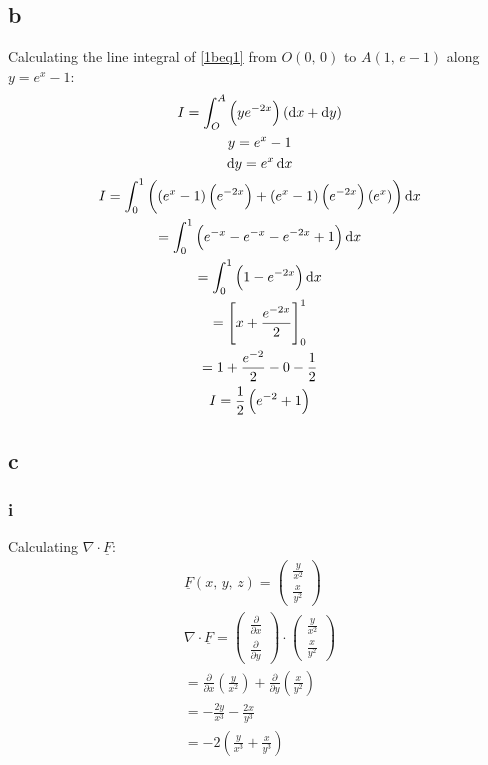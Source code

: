 \documentclass[11pt]{article}
\numberwithin{equation}{section}
\begin{document}
\subsection{b}
Calculating the line integral of \ref{1beq1} from $O\left(0, \, 0\right)$ to $A(1, \, e-1)$ along $y=e^x -1$:
\begin{gather}
    I = \int_O^A \left(ye^{-2x}\right)\left(\dif x + \dif y\right) \label{1beq1}\\
    y = e^x - 1\\
    \dif y = e^x \dif x\\
    I = \int_0^1 \left( \left( e^x-1\right) \left( e^{-2x} \right) + \left( e^x-1\right)\left( e^{-2x}\right)\left( e^x\right)\right)\dif x \\
    = \int_0^1 \left(e^{-x} - e^{-x} - e^{-2x} +1\right)\dif x\\
    = \int_0^1 \left(1-e^{-2x}\right)\dif x \\
    = \left[x + \frac{e^{-2x}}{2}\right]_0^1\\
    = 1 + \frac{e^{-2}}{2} -0-\frac{1}{2}\\
    I = \frac{1}{2}\left(e^{-2}+1\right)
\end{gather}
\subsection{c}
\subsubsection{i}
Calculating $\nabla \cdot \underline{F}$:
\begin{gather}
    \underline{F}\left(x, \, y, \, z\right) = \begin{pmatrix}
        \frac{y}{x^2}\\
        \frac{x}{y^2}
    \end{pmatrix}\\
    \nabla \cdot \underline{F} = \begin{pmatrix}
        \frac{\partial}{\partial x}\\
        \frac{\partial}{\partial y}
    \end{pmatrix} \cdot \begin{pmatrix}
        \frac{y}{x^2}\\
        \frac{x}{y^2}
    \end{pmatrix}\\
    = \frac{\partial}{\partial x}\left(\frac{y}{x^2}\right) + \frac{\partial}{\partial y} \left(\frac{x}{y^2}\right)\\
    = -\frac{2y}{x^3}-\frac{2x}{y^3} \\
    = -2\left(\frac{y}{x^3}+\frac{x}{y^3}\right)
\end{gather}
\end{document}
